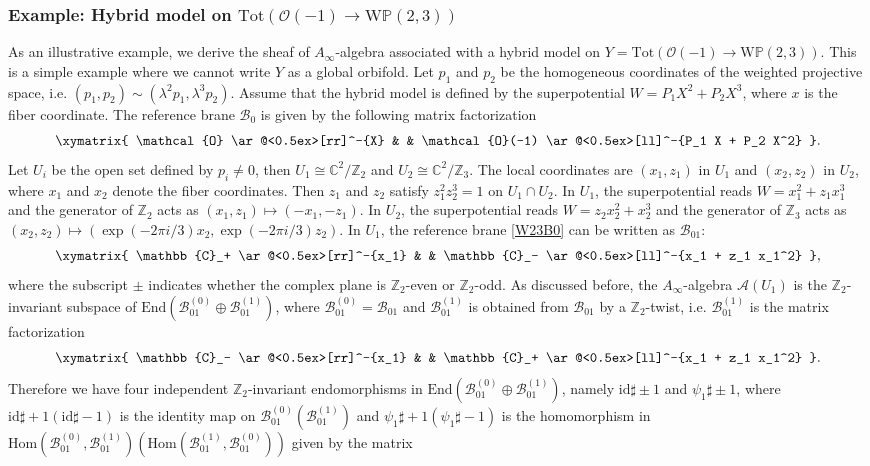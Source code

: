\documentclass[a4paper,11pt]{article}
\numberwithin{equation}{section}
\begin{document}
\subsubsection*{Example: Hybrid model on $\mathrm{Tot}(\mathcal{O}(-1) 
\rightarrow \mathrm{W}\mathbb{P}(2,3))$}

As an illustrative example, we derive the sheaf of $A_\infty$-algebra associated 
with a hybrid model on $Y=\mathrm{Tot}(\mathcal{O}(-1) \rightarrow 
\mathrm{W}\mathbb{P}(2,3))$. This is a simple example where we cannot write $Y$ 
as a global orbifold. Let $p_1$ and $p_2$ be the homogeneous coordinates of the 
weighted projective space, i.e. $(p_1,p_2) \sim (\lambda^2 p_1, \lambda^3 p_2)$. 
Assume that the hybrid model is defined by the superpotential $W = P_1 X^2 + P_2 
X^3$, where $x$ is the fiber coordinate. The reference brane $\mathcal{B}_0$ is 
given by the following matrix factorization
\begin{equation}\label{W23B0}
\xymatrix{
	\mathcal{O} \ar@<0.5ex>[rr]^-{X} & &
\mathcal{O}(-1) \ar@<0.5ex>[ll]^-{P_1 X + P_2 X^2}
}.
\end{equation}
Let $U_i$ be the open set defined by $p_i \neq 0$, then $U_1 \cong 
\mathbb{C}^{2}/\mathbb{Z}_2$ and $U_2 \cong \mathbb{C}^{2}/\mathbb{Z}_3$. The 
local coordinates are $(x_{1},z_1)$ in $U_1$ and $(x_{2},z_2)$ in $U_2$, where  
$x_1$ and $x_2$ denote the 
fiber coordinates. Then $z_{1}$ and $z_{2}$ satisfy $z_1^2 z_2^3 = 1$ on $U_1 
\cap U_2$. In $U_1$, the superpotential 
reads $W = x_1^2 + z_1 x_1^3$ and the generator of $\mathbb{Z}_2$ acts as 
$(x_1,z_1) \mapsto (-x_1,-z_1)$. In $U_2$, the superpotential reads $W = z_2 
x_2^2 + x_2^3$ and the generator of $\mathbb{Z}_3$ acts as $(x_2,z_2) \mapsto 
(\exp(-2\pi i/3) x_2, \exp(-2\pi i/3) z_2)$. In $U_1$, the reference brane 
\eqref{W23B0} can be written as $\mathcal{B}_{01}$:
\[
\xymatrix{
	\mathbb{C}_+ \ar@<0.5ex>[rr]^-{x_1} & &
\mathbb{C}_- \ar@<0.5ex>[ll]^-{x_1 + z_1 x_1^2}
},
\]
where the subscript $\pm$ indicates whether the complex plane is $\mathbb{Z}_2$-even or $\mathbb{Z}_2$-odd. As discussed before, the $A_\infty$-algebra $\mathcal{A}(U_1)$ is the $\mathbb{Z}_2$-invariant subspace of $\mathrm{End}(\mathcal{B}_{01}^{(0)} \oplus \mathcal{B}_{01}^{(1)})$, where $\mathcal{B}_{01}^{(0)} = \mathcal{B}_{01}$ and $\mathcal{B}_{01}^{(1)}$ is obtained from $\mathcal{B}_{01}$ by a $\mathbb{Z}_2$-twist, i.e. $\mathcal{B}_{01}^{(1)}$ is the matrix factorization
\[
\xymatrix{
	\mathbb{C}_- \ar@<0.5ex>[rr]^-{x_1} & &
\mathbb{C}_+ \ar@<0.5ex>[ll]^-{x_1 + z_1 x_1^2}
}.
\]
Therefore we have four independent $\mathbb{Z}_2$-invariant endomorphisms in $\mathrm{End}(\mathcal{B}_{01}^{(0)} \oplus \mathcal{B}_{01}^{(1)})$, namely $\mathrm{id} \sharp \pm 1$ and $\psi_1 \sharp \pm 1$, where $\mathrm{id} \sharp +1 (\mathrm{id} \sharp -1)$ is the identity map on $\mathcal{B}_{01}^{(0)} (\mathcal{B}_{01}^{(1)})$ and $\psi_1 \sharp +1 (\psi_1 \sharp -1)$ is the homomorphism in $\mathrm{Hom}(\mathcal{B}_{01}^{(0)}, \mathcal{B}_{01}^{(1)}) (\mathrm{Hom}(\mathcal{B}_{01}^{(1)}, \mathcal{B}_{01}^{(0)}))$ given by the matrix
\end{document}
